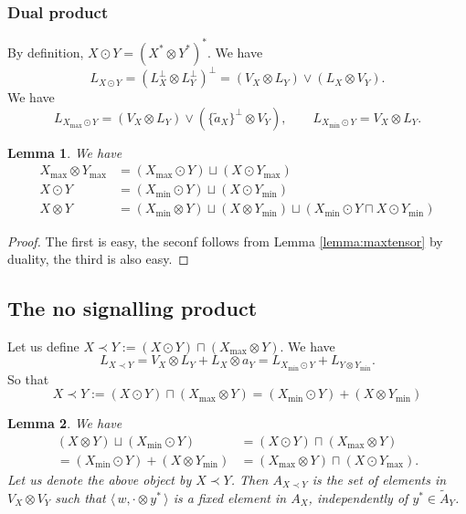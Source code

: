 \documentclass[12pt]{article}
\newtheorem{lemma}{Lemma}
\theoremstyle{definition}
\theoremstyle{remark}
\def\<{\langle\,}
\def\>{\,\rangle}
\begin{document}
\subsubsection{Dual product}
By definition,  $X\odot Y=(X^*\otimes Y^*)^*$. We have
\[
L_{X\odot Y}=(L_X^\perp\otimes L_Y^\perp)^\perp=(V_X\otimes L_Y)\vee (L_X\otimes V_Y).
\]
We have
\[
L_{X_{\max}\odot Y}=(V_X\otimes L_Y)\vee(\{\tilde a_X\}^\perp\otimes V_Y),\qquad
L_{X_{\min}\odot Y}=V_X\otimes L_Y.
\]
\begin{lemma}\label{lemma:maxdual} We have
\begin{align*}
X_{\max}\otimes Y_{\max}&=(X_{\max}\odot Y)\sqcup (X\odot Y_{\max})\\
X\odot Y&=(X_{\min}\odot Y)\sqcup (X\odot Y_{\min})\\
X\otimes Y&= (X_{\min}\otimes Y)\sqcup (X\otimes Y_{\min})\sqcup (X_{\min}\odot Y \sqcap
X\odot Y_{\min}) 
\end{align*}


\end{lemma}

\begin{proof} The first is easy, the seconf follows from Lemma \ref{lemma:maxtensor} by
duality, the third is also easy.

\end{proof}

\subsection{The no signalling product}

Let us define $X\prec Y:= (X\odot Y)\sqcap (X_{\max}\otimes Y)$. We have
\[
L_{X\prec Y}=V_X\otimes L_Y+L_X\otimes a_Y=L_{X_{\min}\odot Y}+L_{Y\otimes Y_{\min}}.
\]
So that
\[
X\prec Y:= (X\odot Y)\sqcap (X_{\max}\otimes Y)=(X_{\min}\odot Y)+(X\otimes Y_{\min})
\]

\begin{lemma}\label{lemma:nosig}
We have
\begin{align*}
(X\otimes Y)\sqcup (X_{\min}\odot Y)&=(X\odot Y)\sqcap (X_{\max}\otimes Y)\\
=(X_{\min}\odot Y) + (X\otimes Y_{\min})&=(X_{\max}\otimes Y)\sqcap (X\odot Y_{\max}).
\end{align*}
Let us denote the above object by $X\prec Y$. Then $A_{X\prec Y}$ is the set of elements
in $V_X\otimes V_Y$ such that $\<w,\cdot \otimes y^*\>$ is a fixed element in $A_X$,
independently of $y^*\in \tilde A_Y$.
\end{lemma}
\end{document}
